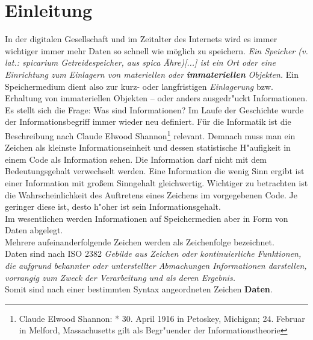 
\chapter{Einleitung}
\label{ch:Einleitung}

In der digitalen Gesellschaft und im Zeitalter des Internets wird es immer wichtiger immer mehr Daten so schnell wie möglich zu speichern.  \textit{Ein Speicher (v. lat.: spicarium Getreidespeicher, aus spica Ähre)[...] ist ein Ort oder eine Einrichtung zum Einlagern von materiellen oder} \textbf{\textit{immateriellen}} \textit{Objekten.} \cite{wiki:Speicher}
\newline
Ein Speichermedium dient also zur kurz- oder langfristigen \glqq \textit{Einlagerung}\grqq{} bzw. Erhaltung von immateriellen Objekten – oder anders ausgedr"uckt Informationen. 
Es stellt sich die Frage: Was sind Informationen? \newline
Im Laufe der Geschichte wurde der Informationsbegriff immer wieder neu definiert. Für die Informatik ist die Beschreibung nach Claude Elwood Shannon\footnote[1]{Claude Elwood Shannon: * 30. April 1916 in Petoskey, Michigan; \textdagger{} 24. Februar in Melford, Massachusetts gilt als Begr"uender der Informationstheorie} relevant. Demnach muss man ein Zeichen als kleinste Informationseinheit und dessen statistische H"aufigkeit in einem Code als Information sehen. 
\newline
Die Information darf nicht mit dem Bedeutungsgehalt verwechselt werden. Eine Information die wenig Sinn ergibt ist einer Information mit großem Sinngehalt gleichwertig. Wichtiger zu betrachten ist die Wahrscheinlichkeit des Auftretens eines Zeichens im vorgegebenen Code. Je geringer diese ist, desto h"oher ist sein Informationsgehalt.
\\
Im wesentlichen werden Informationen auf Speichermedien aber in Form von Daten abgelegt. 
\\Mehrere aufeinanderfolgende Zeichen werden als Zeichenfolge bezeichnet.\cite{hansen:wi1}
\\ 
Daten sind nach ISO 2382 
\glqq \textit{Gebilde aus Zeichen oder kontinuierliche Funktionen, die aufgrund bekannter oder unterstellter Abmachungen Informationen darstellen, vorrangig zum Zweck der Verarbeitung und als deren Ergebnis.}\grqq{} 
\\
Somit sind nach einer bestimmten Syntax angeordneten Zeichen \textbf{Daten}.

